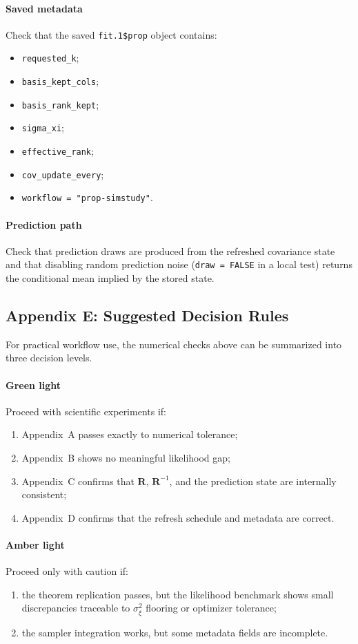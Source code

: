 \documentclass[11pt]{article}
\newcommand{\bR}{\mathbf{R}}
\begin{document}
\paragraph{Saved metadata}
Check that the saved \texttt{fit.1\$prop} object contains:
\begin{itemize}
\item \texttt{requested\_k};
\item \texttt{basis\_kept\_cols};
\item \texttt{basis\_rank\_kept};
\item \texttt{sigma\_xi};
\item \texttt{effective\_rank};
\item \texttt{cov\_update\_every};
\item \texttt{workflow = "prop-simstudy"}.
\end{itemize}

\paragraph{Prediction path}
Check that prediction draws are produced from the refreshed covariance state and
that disabling random prediction noise (\texttt{draw = FALSE} in a local test)
returns the conditional mean implied by the stored state.

\subsection{Appendix E: Suggested Decision Rules}

For practical workflow use, the numerical checks above can be summarized into
three decision levels.

\paragraph{Green light}
Proceed with scientific experiments if:
\begin{enumerate}[label=\arabic*.]
\item Appendix~A passes exactly to numerical tolerance;
\item Appendix~B shows no meaningful likelihood gap;
\item Appendix~C confirms that \(\bR\), \(\bR^{-1}\), and the prediction state
are internally consistent;
\item Appendix~D confirms that the refresh schedule and metadata are correct.
\end{enumerate}

\paragraph{Amber light}
Proceed only with caution if:
\begin{enumerate}[label=\arabic*.]
\item the theorem replication passes, but the likelihood benchmark shows small
discrepancies traceable to \(\sigma_\xi^2\) flooring or optimizer tolerance;
\item the sampler integration works, but some metadata fields are incomplete.
\end{enumerate}
\end{document}
